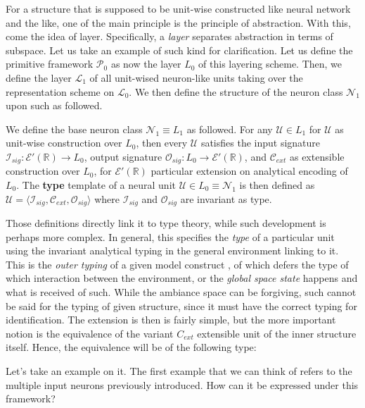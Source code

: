 For a structure that is supposed to be unit-wise constructed like neural network and the like, one of the main principle is the principle of abstraction. With this, come the idea of layer. Specifically, a \textit{layer} separates abstraction in terms of subspace. Let us take an example of such kind for clarification. Let us define the primitive framework $\mathcal{P}_{0}$ as now the layer $L_{0}$ of this layering scheme. Then, we define the layer $\mathcal{L}_{1}$ of all unit-wised neuron-like units taking over the representation scheme on $\mathcal{L}_{0}$. We then define the structure of the neuron class $\mathcal{N}_{1}$ upon such as followed. 

\begin{definition}
    We define the base neuron class $\mathcal{N}_{1}\equiv L_{1}$ as followed. For any $\mathcal{U}\in L_{1}$ for $\mathcal{U}$ as unit-wise construction over $L_{0}$, then every $\mathcal{U}$ satisfies the input signature $\mathcal{I}_{sig}:\mathcal{E}'(\mathbb{R})\to L_{0}$, output signature $\mathcal{O}_{sig}:L_{0}\to\mathcal{E}'(\mathbb{R})$, and $\mathcal{C}_{ext}$ as extensible construction over $L_{0}$, for $\mathcal{E}'(\mathbb{R})$ particular extension on analytical encoding of $L_{0}$. The \textbf{type} template of a neural unit $\mathcal{U}\in L_{0}\equiv \mathcal{N}_{1}$ is then defined as $\mathcal{U}=\langle \mathcal{I}_{sig},\mathcal{C}_{ext},\mathcal{O}_{sig}\rangle$ where $\mathcal{I}_{sig}$ and $\mathcal{O}_{sig}$ are invariant as type. 
\end{definition}

Those definitions directly link it to type theory, while such development is perhaps more complex. In general, this specifies the \textit{type} of a particular unit using the invariant analytical typing in the general environment linking to it. This is the \textit{outer typing} of a given model construct , of which defers the type of which interaction between the environment, or the \textit{global space state} happens and what is received of such. While the ambiance space can be forgiving, such cannot be said for the typing of given structure, since it must have the correct typing for identification. The extension is then is fairly simple, but the more important notion is the equivalence of the variant $C_{ext}$ extensible unit of the inner structure itself. Hence, the equivalence will be of the following type: 

Let's take an example on it. The first example that we can think of refers to the multiple input neurons previously introduced. How can it be expressed under this framework? 

